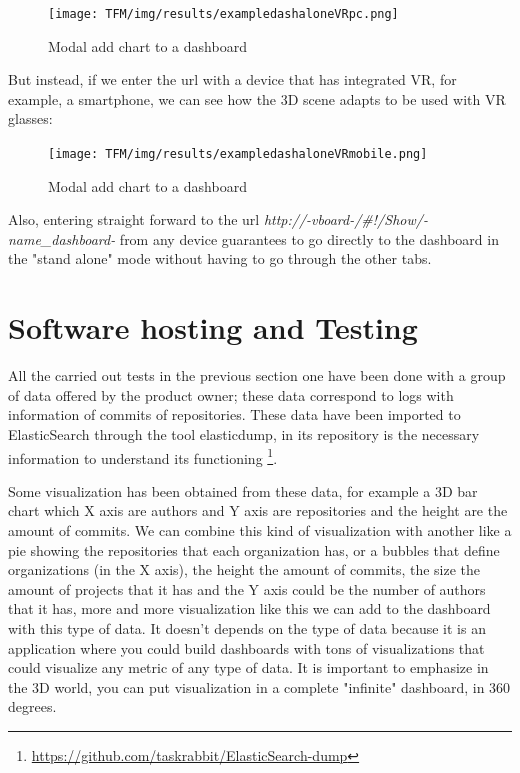 \documentclass[a4paper, 12pt]{book}
\begin{document}
\begin{figure}[H]
  \centering
  \texttt{[image: TFM/img/results/exampledashaloneVRpc.png]}
  \caption{Modal add chart to a dashboard}
  \label{fig:onlynodes}
\end{figure}

But instead, if we enter the url with a device that has integrated VR, for example, a smartphone, we can see how the 3D scene adapts to be used with VR glasses:

\begin{figure}[H]
  \centering
  \texttt{[image: TFM/img/results/exampledashaloneVRmobile.png]}
  \caption{Modal add chart to a dashboard}
  \label{fig:onlynodes}
\end{figure}
Also, entering straight forward to the url \textit{http://-vboard-/\#!/Show/-name\_dashboard-} from any device guarantees to go directly to the dashboard in the "stand alone" mode without having to go through the other tabs.


\section{Software hosting and Testing}
\label{sec:softhostest}

All the carried out tests in the previous section one have been done with a group of data offered by the product owner; these data correspond to logs with information of commits of repositories.
These data have been imported to ElasticSearch through the tool elasticdump, in its repository is the necessary information to understand its functioning \footnote{\url{https://github.com/taskrabbit/ElasticSearch-dump}}.

Some visualization has been obtained from these
data, for example a 3D bar chart which X axis are authors and Y axis are repositories and the height are the amount of commits. We can combine this kind of visualization with another like a pie showing the repositories that each organization has, or a bubbles that define organizations (in the X axis), the height the amount of commits, the size the amount of projects that it has and the Y axis could be the number of authors that it has, more and more visualization like this we can add to the dashboard with this type of data. It doesn't depends on the type of data because it is an application where you could build dashboards with tons of visualizations that could visualize any metric of any type of data. It is important to emphasize in the 3D world, you can put visualization in a complete "infinite" dashboard, in 360 degrees.
\end{document}
